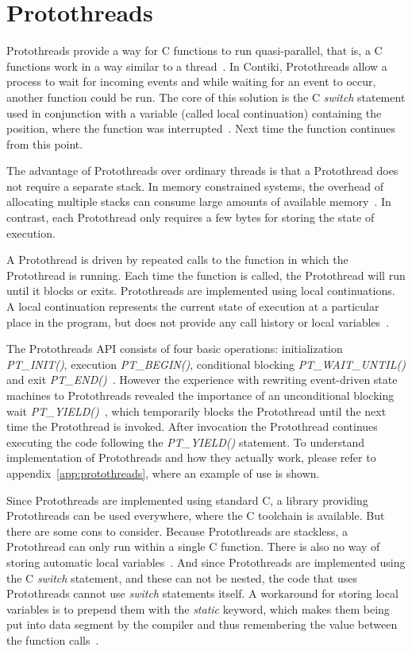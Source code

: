 
\section{Protothreads}\label{sec:contiki-protothreads}
Protothreads provide a way for C functions to run quasi-parallel,
that is, a C functions work in a way similar to a thread~\cite{paper-protothreads}.
In Contiki, Protothreads allow a process to wait for incoming events and
while waiting for an event to occur, another function could be run.
The core of this solution is the C {\it switch} statement used in conjunction with a variable (called local continuation)
containing the position, where the function was interrupted~\cite{paper-protothreads}.
Next time the function continues from this point.

The advantage of Protothreads over ordinary threads is that a Protothread does not require a separate stack.
In memory constrained systems, the overhead of allocating multiple stacks can consume large amounts of
available memory~\cite{paper-protothreads}.
In contrast, each Protothread only requires a few bytes for storing the state of execution.

A Protothread is driven by repeated calls to the function in which the Protothread is running.
Each time the function is called, the Protothread will run until it blocks or exits.
Protothreads are implemented using local continuations. A local continuation represents the current state
of execution at a particular place in the program, but does not provide any call history or local variables~\cite{contiki-docs}.

The Protothreads API consists of four basic operations: initialization {\it{PT\_INIT()}}, execution {\it{PT\_BEGIN()}},
conditional blocking {\it{PT\_WAIT\_UNTIL()}} and exit {\it{PT\_END()}}~\cite{paper-protothreads}.
However the experience with rewriting event-driven state machines to Protothreads revealed
the importance of an unconditional blocking wait {\it{PT\_YIELD()}}~\cite{thesis-programming},
which temporarily blocks the Protothread until the next time the Protothread is invoked.
After invocation the Protothread continues executing the code following the {\it{PT\_YIELD()}} statement.
To understand implementation of Protothreads and how they actually work,
please refer to appendix~\ref{app:protothreads}, where an example of use is shown.

Since Protothreads are implemented using standard C, a library providing Protothreads can be used everywhere,
where the C toolchain is available.
But there are some cons to consider. Because Protothreads are stackless, a Protothread can only run within a single C function.
There is also no way of storing automatic local variables~\cite{contiki-docs}.
And since Protothreads are implemented using the C {\it switch} statement, and these can
not be nested, the code that uses Protothreads cannot use {\it switch} statements itself.
A workaround for storing local variables is to prepend them with the {\it static} keyword, which makes them being put into data segment
by the compiler and thus remembering the value between the function calls~\cite{paper-protothreads}.
